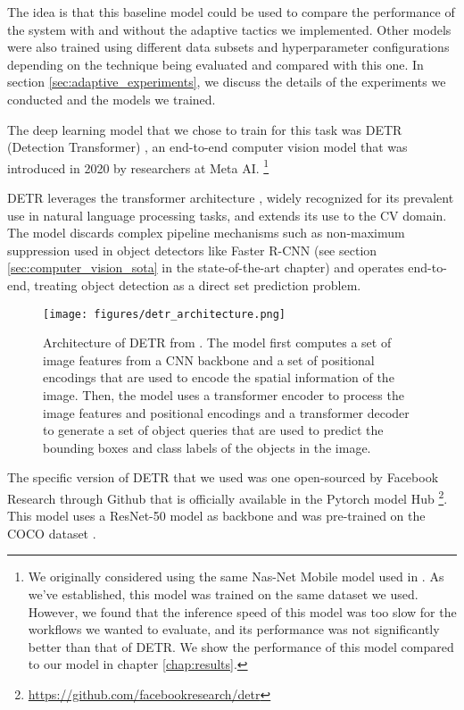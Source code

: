 \documentclass[../main.tex]{subfiles}
\begin{document}
 The idea is that this baseline model could be used to compare the performance of the system with and without the adaptive tactics we implemented. Other models were also trained using different data subsets and hyperparameter configurations depending on the technique being evaluated and compared with this one. In section \ref{sec:adaptive_experiments}, we discuss the details of the experiments we conducted and the models we trained.

 The deep learning model that we chose to train for this task was DETR (Detection Transformer) \cite{carionEndtoEndObjectDetection2020}, an end-to-end computer vision model that was introduced in 2020 by researchers at Meta AI. \footnote{We originally considered using the same Nas-Net Mobile model used in \cite{visuna_novel_2023}. As we've established, this model was trained on the same dataset we used. However, we found that the inference speed of this model was too slow for the workflows we wanted to evaluate, and its performance was not significantly better than that of DETR. We show the performance of this model compared to our model in chapter \ref{chap:results}.}

 DETR leverages the transformer architecture \cite{vaswaniAttentionAllYou2017}, widely recognized for its prevalent use in natural language processing tasks, and extends its use to the CV domain. The model discards complex pipeline mechanisms such as non-maximum suppression used in object detectors like Faster R-CNN (see section \ref{sec:computer_vision_sota} in the state-of-the-art chapter) and operates end-to-end, treating object detection as a direct set prediction problem.

 \begin{figure}[t]
     \centering
     \texttt{[image: figures/detr\_architecture.png]}
     \caption{
        Architecture of DETR from \cite{carionEndtoEndObjectDetection2020}. 
        \footnotesize The model first computes a set of image features from a CNN backbone and a set of positional encodings that are used to encode the spatial information of the image. Then, the model uses a transformer encoder to process the image features and positional encodings and a transformer decoder to generate a set of object queries that are used to predict the bounding boxes and class labels of the objects in the image.
     }
     \label{fig:detr-architecture}
 \end{figure}

 The specific version of DETR that we used was one open-sourced by Facebook Research through Github that is officially available in the Pytorch model Hub \footnote{\url{https://github.com/facebookresearch/detr}}. This model uses a ResNet-50 model as backbone \cite{heSpatialPyramidPooling2014} and was pre-trained on the COCO dataset \cite{linMicrosoftCOCOCommon2015}. 
\end{document}
